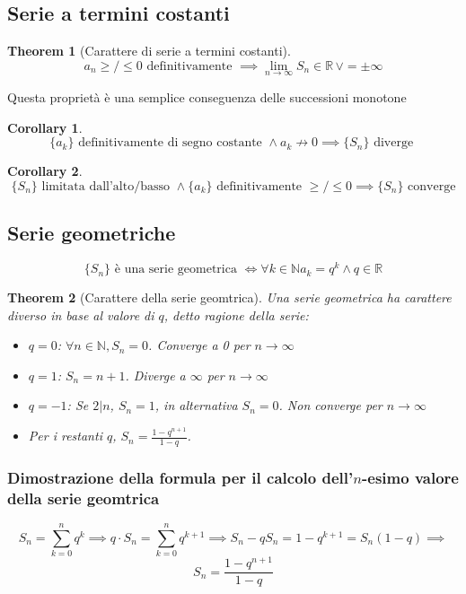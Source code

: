 \documentclass{article}
\newtheorem{theorem}{Theorem}[section]
\newtheorem{corollary}{Corollary}[theorem]
\begin{document}
    \subsection{Serie a termini costanti}
        \begin{theorem}[Carattere di serie a termini costanti]
            $$a_n \geq/\leq 0 \textrm{ definitivamente } \implies \lim_{n \to \infty} S_n \in \mathbb{R} \, \lor = \pm \infty$$
        \end{theorem}
        Questa proprietà è una semplice conseguenza delle successioni monotone
        \begin{corollary}
            $$\{a_k\} \textrm{ definitivamente di segno costante } \land a_k \not\to 0 \implies \{S_n\} \textrm{ diverge }$$
        \end{corollary}
        \begin{corollary}
            $$\{S_n\} \textrm{ limitata dall'alto/basso } \land \{a_k\} \textrm{ definitivamente } \geq/\leq 0 \implies \{S_n\} \textrm{ converge}$$
        \end{corollary}
    \subsection{Serie geometriche}
        $$\{S_n\} \textrm{ è una serie geometrica } \iff \forall k \in \mathbb{N} a_k = q^k \land q \in \mathbb{R}$$
        \begin{theorem}[Carattere della serie geomtrica]
            Una serie geometrica ha carattere diverso in base al valore di $q$, detto ragione della serie:
            \begin{itemize}
                \item $q = 0$: $\forall n \in \mathbb{N}, S_n = 0$. Converge a 0 per $n \to \infty$
                \item $q = 1$: $S_n = n + 1$. Diverge a $\infty$ per $n \to \infty$
                \item $q = -1$: Se $2 | n$, $S_n = 1$, in alternativa $S_n = 0$. Non converge per $n \to \infty$
                \item Per i restanti $q$, $S_n = \frac{1-q^{n+1}}{1-q}$. 
            \end{itemize}
        \end{theorem}
        \subsubsection{Dimostrazione della formula per il calcolo dell'$n$-esimo valore della serie geomtrica}
            $$S_n = \sum_{k=0}^n q^k \implies q \cdot S_n = \sum_{k=0}^n q^{k+1} \implies 
                S_n - qS_n = 1 - q^{k+1} = S_n\left(1 - q\right) \implies$$
            $$S_n = \frac{1 - q^{n+1}}{1 - q}$$
\end{document}
